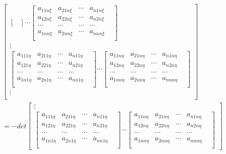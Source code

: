 \documentclass[twoside,a4paper,CCT]{cctart}   %
\begin{document}
\begin{list}{}
\begin{align*}
\begin{bmatrix}
\begin{bmatrix}
\end{bmatrix}
\cdots
\begin{bmatrix}
  a_{11n\xi}& a_{21n\xi}&\cdots&a_{n1n\xi}\\
  a_{12n\xi}& a_{22n\xi}&\cdots&a_{n2n\xi}\\
  \cdots&\cdots&\cdots &\cdots& \\
 a_{1nn\xi}& a_{2nn\xi}&\cdots&a_{nnn\xi}\\
 \end{bmatrix}\\
\vdots\\
\begin{bmatrix}
  a_{111\eta}& a_{211\eta}&\cdots&a_{n11\eta}\\
  a_{121\eta}& a_{221\eta}&\cdots&a_{n21\eta}\\
  \cdots&\cdots&\cdots &\cdots& \\
   a_{1n1\eta}& a_{2n1\eta}&\cdots&a_{nn1\eta}\\
   \end{bmatrix}
\cdots
\begin{bmatrix}
  a_{11n\eta}& a_{21n\eta}&\cdots&a_{n1n\eta}\\
  a_{12n\eta}& a_{22n\eta}&\cdots&a_{n2n\eta}\\
  \cdots&\cdots&\cdots &\cdots& \\
   a_{1nn\eta }& a_{2nn\eta}&\cdots&a_{nnn\eta}\\
   \end{bmatrix}\\
\vdots\\
    \end{bmatrix}\\
=-det
  \begin{bmatrix}
\vdots\\
 \begin{bmatrix}
   a_{111\eta}& a_{211\eta}&\cdots&a_{n11\eta}\\
   a_{121\eta}& a_{221\eta}&\cdots&a_{n21\eta}\\
  \cdots&\cdots&\cdots &\cdots& \\
   a_{1n1\eta}& a_{2n1\eta}&\cdots&a_{nn1\eta}\\
   \end{bmatrix}
\cdots
\begin{bmatrix}
  a_{11n\eta}& a_{21n\eta}&\cdots&a_{n1n\eta}\\
  a_{12n\eta}& a_{22n\eta}&\cdots&a_{n2n\eta}\\
  \cdots&\cdots&\cdots &\cdots& \\
  a_{1nn\eta }& a_{2nn\eta}&\cdots&a_{nnn\eta}\\

\end{bmatrix}
\end{bmatrix}
\end{align*}
\end{list}
\end{document}

